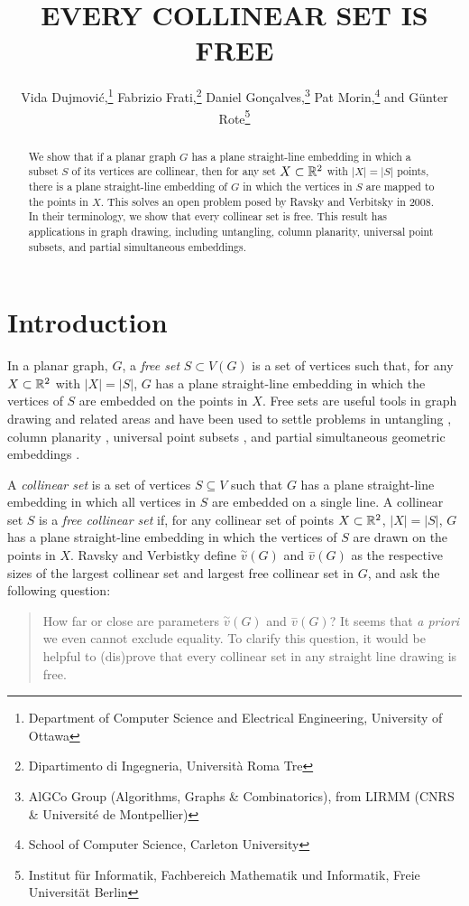 \documentclass{patmorin}
\title{\MakeUppercase{Every Collinear Set is Free}}
\author{Vida Dujmović,\thanks{Department of Computer Science and Electrical Engineering, University of Ottawa}\quad
      Fabrizio Frati,\thanks{Dipartimento di Ingegneria,
Università Roma Tre}\quad
      Daniel Gonçalves,\thanks{AlGCo Group (Algorithms, Graphs \& Combinatorics), from LIRMM (CNRS \& Université de Montpellier)}\quad 
      Pat Morin,\thanks{School of Computer Science, Carleton University}\quad
      and Günter Rote\thanks{Institut für Informatik,
Fachbereich Mathematik und Informatik, 
Freie Universität Berlin }}
\begin{document}
\maketitle


\begin{abstract}
  We show that if a planar graph $G$ has a plane straight-line embedding
  in which a subset $S$ of its vertices are collinear, then for any set
  $X\subset\mathbb{R}^2$ with $|X|=|S|$ points, there is a plane straight-line
  embedding of $G$ in which the vertices in $S$ are mapped to the points
  in $X$.  This solves an open problem posed by Ravsky and Verbitsky in
  2008.  In their terminology, we show that every collinear set is free.
  This result has applications in graph drawing, including untangling,
  column planarity, universal point subsets, and partial simultaneous
  embeddings.
\end{abstract}


\section{Introduction}

In a planar graph, $G$, a \emph{free set} $S\subset V(G)$ is a set of
vertices such that, for any $X\subset\mathbb{R}^2$ with $|X|=|S|$, $G$ has a plane
straight-line embedding in which the vertices of $S$ are embedded
on the points in $X$.  Free sets are useful tools in graph drawing
and related areas and have been used to settle problems in untangling
\cite{X}, column planarity \cite{X}, universal point subsets \cite{X},
and partial simultaneous geometric embeddings \cite{X}.

A \emph{collinear set} is a set of vertices
$S\subseteq V$ such that $G$ has a plane straight-line embedding in which
all vertices in $S$ are embedded on a single line.  A collinear set $S$
is a \emph{free collinear set} if, for any collinear set of points
$X\subset\mathbb{R}^2$, $|X|=|S|$, $G$ has a plane straight-line embedding in
which the vertices of $S$ are drawn on the points in $X$.  
Ravsky and Verbistky \cite{ravsky.verbitsky:on,ravsky.verbitsky:on-arxiv}
define $\stackrel{\sim}{v}(G)$ and $\stackrel{-}{v}(G)$ as the respective sizes of the
largest collinear set and largest free collinear set in $G$, and ask
the following question:

\begin{quote}
   How far or close are parameters $\stackrel{\sim}{v}(G)$ and $\stackrel{-}{v}(G)$? It
   seems that \emph{a priori} we even cannot exclude equality. To clarify
   this question, it would be helpful to (dis)prove that every collinear
   set in any straight line drawing is free.
\end{quote}
\end{document}
